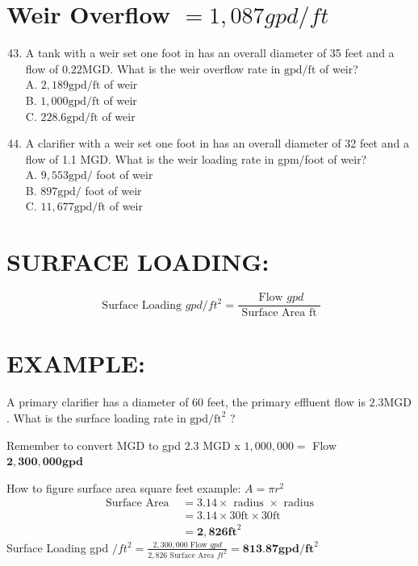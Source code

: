 \documentclass[10pt]{article}
\begin{document}
\section{Weir Overflow $=1,087 g p d / f t$}
\begin{enumerate}
  \setcounter{enumi}{42}
  \item A tank with a weir set one foot in has an overall diameter of 35 feet and a flow of $0.22 \mathrm{MGD}$. What is the weir overflow rate in $\mathrm{gpd} / \mathrm{ft}$ of weir?\\
A. $2,189 \mathrm{gpd} / \mathrm{ft}$ of weir\\
B. $1,000 \mathrm{gpd} / \mathrm{ft}$ of weir\\
C. $228.6 \mathrm{gpd} / \mathrm{ft}$ of weir

  \item A clarifier with a weir set one foot in has an overall diameter of 32 feet and a flow of 1.1 MGD. What is the weir loading rate in gpm/foot of weir?\\
A. $9,553 \mathrm{gpd} /$ foot of weir\\
B. $897 \mathrm{gpd} /$ foot of weir\\
C. $11,677 \mathrm{gpd} / \mathrm{ft}$ of weir

\end{enumerate}
\section{SURFACE LOADING:}
$$
\text { Surface Loading } g p d / f t^{2}=\frac{\text { Flow } g p d}{\text { Surface Area ft }}
$$

\section{EXAMPLE:}
A primary clarifier has a diameter of 60 feet, the primary effluent flow is $2.3 \mathrm{MGD}$. What is the surface loading rate in $\mathrm{gpd} / \mathrm{ft}^{2}$ ?

Remember to convert MGD to gpd $2.3$ MGD x $1,000,000=$ Flow $\mathbf{2 , 3 0 0 , 0 0 0} \mathbf{g p d}$

How to figure surface area square feet example: $A=\pi r^{2}$
$$
\begin{aligned}
\text { Surface Area } &=3.14 \times \text { radius } \times \text { radius } \\
&=3.14 \times 30 \mathrm{ft} \times 30 \mathrm{ft} \\
&=\mathbf{2}, \mathbf{8 2 6} \mathbf{f t}^{2}
\end{aligned}
$$
Surface Loading gpd $/ f t^{2}=\frac{2,300,000 \text { Flow } g p d}{2,826 \text { Surface Area } f t^{2}}=\mathbf{8 1 3 . 8 7} \mathbf{g p d} / \mathbf{f t}^{2}$
\end{document}
